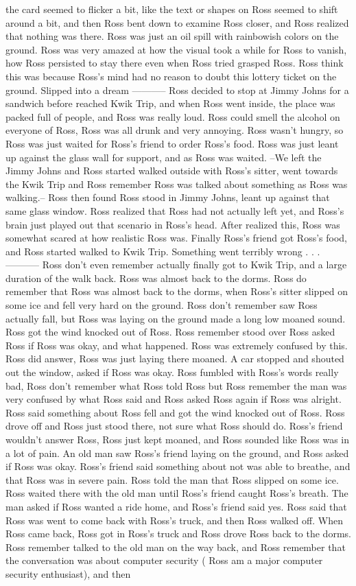 \documentclass[12pt]{book}
\begin{document}
the card seemed to flicker a bit, like the text or shapes on Ross seemed to shift around a bit, and then Ross bent down to examine Ross closer, and Ross realized that nothing was there. Ross was just an oil spill with rainbowish colors on the ground. Ross was very amazed at how the visual took a while for Ross to vanish, how Ross persisted to stay there even when Ross tried grasped Ross. Ross think this was because Ross's mind had no reason to doubt this lottery ticket on the ground. Slipped into a dream ----------- Ross decided to stop at Jimmy Johns for a sandwich before reached Kwik Trip, and when Ross went inside, the place was packed full of people, and Ross was really loud. Ross could smell the alcohol on everyone of Ross, Ross was all drunk and very annoying. Ross wasn't hungry, so Ross was just waited for Ross's friend to order Ross's food. Ross was just leant up against the glass wall for support, and as Ross was waited. --We left the Jimmy Johns and Ross started walked outside with Ross's sitter, went towards the Kwik Trip and Ross remember Ross was talked about something as Ross was walking.-- Ross then found Ross stood in Jimmy Johns, leant up against that same glass window. Ross realized that Ross had not actually left yet, and Ross's brain just played out that scenario in Ross's head. After realized this, Ross was somewhat scared at how realistic Ross was. Finally Ross's friend got Ross's food, and Ross started walked to Kwik Trip. Something went terribly wrong . . .  ----------- Ross don't even remember actually finally got to Kwik Trip, and a large duration of the walk back. Ross was almost back to the dorms. Ross do remember that Ross was almost back to the dorms, when Ross's sitter slipped on some ice and fell very hard on the ground. Ross don't remember saw Ross actually fall, but Ross was laying on the ground made a long low moaned sound. Ross got the wind knocked out of Ross. Ross remember stood over Ross asked Ross if Ross was okay, and what happened. Ross was extremely confused by this. Ross did answer, Ross was just laying there moaned. A car stopped and shouted out the window, asked if Ross was okay. Ross fumbled with Ross's words really bad, Ross don't remember what Ross told Ross but Ross remember the man was very confused by what Ross said and Ross asked Ross again if Ross was alright. Ross said something about Ross fell and got the wind knocked out of Ross. Ross drove off and Ross just stood there, not sure what Ross should do. Ross's friend wouldn't answer Ross, Ross just kept moaned, and Ross sounded like Ross was in a lot of pain. An old man saw Ross's friend laying on the ground, and Ross asked if Ross was okay. Ross's friend said something about not was able to breathe, and that Ross was in severe pain. Ross told the man that Ross slipped on some ice. Ross waited there with the old man until Ross's friend caught Ross's breath. The man asked if Ross wanted a ride home, and Ross's friend said yes. Ross said that Ross was went to come back with Ross's truck, and then Ross walked off. When Ross came back, Ross got in Ross's truck and Ross drove Ross back to the dorms. Ross remember talked to the old man on the way back, and Ross remember that the conversation was about computer security ( Ross am a major computer security enthusiast), and then 
\end{document}
